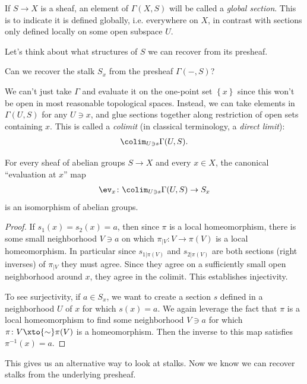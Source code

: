 \documentclass[11pt]{amsart}
\begin{document}
\begin{terminology} If $S \to X$ is a sheaf, an element of $\Gamma(X,S)$ will be called a \emph{global section}. This is to indicate it is defined globally, i.e. everywhere on $X$, in contrast with sections only defined locally on some open subspace $U$.
\end{terminology}

Let's think about what structures of $S$ we can recover from its presheaf.

\begin{question} Can we recover the stalk $S_x$ from the presheaf $\Gamma(-,S)$?
\end{question}

We can't just take $\Gamma$ and evaluate it on the one-point set $\left\{ x \right\}$ since this won't be open in most reasonable topological spaces. Instead, we can take elements in $\Gamma(U,S)$ for any $U \ni x$, and glue sections together along restriction of open sets containing $x$. This is called a \emph{colimit} (in classical terminology, a \emph{direct limit}):
\begin{align*}
    \colim_{U\ni s}\Gamma(U,S).
\end{align*}
%
\begin{proposition}\label{prop:colimit-sections-is-stalk}
For every sheaf of abelian groups $S \to X$ and every $x\in X$, the canonical ``evaluation at $x$'' map
\begin{align*}
    \ev_x \colon \colim_{U\ni s} \Gamma(U,S) \to S_x
\end{align*}
is an isomorphism of abelian groups.
\end{proposition}
\begin{proof} If $s_1(x) = s_2(x) = a$, then since $\pi$ is a local homeomorphism, there is some small neighborhood $V \ni a$ on which $\pi_{|V} \colon V \to \pi(V)$ is a local homeomorphism. In particular since $s_{1|\pi(V)}$ and $s_{2|\pi(V)}$ are both sections (right inverses) of $\pi_{|V}$ they must agree. Since they agree on a sufficiently small open neighborhood around $x$, they agree in the colimit. This establishes injectivity.

To see surjectivity, if $a\in S_x$, we want to create a section $s$ defined in a neighborhood $U$ of $x$ for which $s(x) = a$. We again leverage the fact that $\pi$ is a local homeomorphism to find some neighborhood $V \ni a$ for which $\pi \colon V \xto{\sim} \pi(V)$ is a homeomorphism. Then the inverse to this map satisfies $\pi^{-1}(x) = a$.
\end{proof}
This gives us an alternative way to look at stalks. Now we know we can recover stalks from the underlying presheaf.
\end{document}
